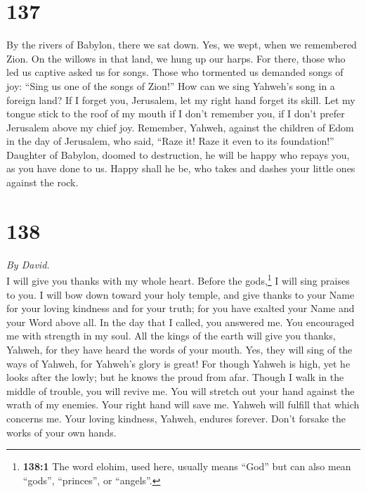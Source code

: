 \hypertarget{section-136}{%
\section{137}\label{section-136}}

 By the rivers of Babylon, there we sat down. Yes, we
wept, when we remembered Zion.  On the willows in that
land, we hung up our harps.  For there, those who led us
captive asked us for songs. Those who tormented us demanded songs of
joy: ``Sing us one of the songs of Zion!''  How can we
sing Yahweh's song in a foreign land?  If I forget you,
Jerusalem, let my right hand forget its skill.  Let my
tongue stick to the roof of my mouth if I don't remember you, if I don't
prefer Jerusalem above my chief joy.  Remember, Yahweh,
against the children of Edom in the day of Jerusalem, who said, ``Raze
it! Raze it even to its foundation!''  Daughter of
Babylon, doomed to destruction, he will be happy who repays you, as you
have done to us.  Happy shall he be, who takes and dashes
your little ones against the rock.

\hypertarget{section-137}{%
\section{138}\label{section-137}}

\emph{By David.}\\
 I will give you thanks with my whole heart. Before the
gods,\footnote{\textbf{138:1} The word elohim, used here, usually means
  ``God'' but can also mean ``gods'', ``princes'', or ``angels''.} I
will sing praises to you.  I will bow down toward your
holy temple, and give thanks to your Name for your loving kindness and
for your truth; for you have exalted your Name and your Word above all.
 In the day that I called, you answered me. You encouraged
me with strength in my soul.  All the kings of the earth
will give you thanks, Yahweh, for they have heard the words of your
mouth.  Yes, they will sing of the ways of Yahweh, for
Yahweh's glory is great!  For though Yahweh is high, yet
he looks after the lowly; but he knows the proud from afar.
 Though I walk in the middle of trouble, you will revive
me. You will stretch out your hand against the wrath of my enemies. Your
right hand will save me.  Yahweh will fulfill that which
concerns me. Your loving kindness, Yahweh, endures forever. Don't
forsake the works of your own hands.

